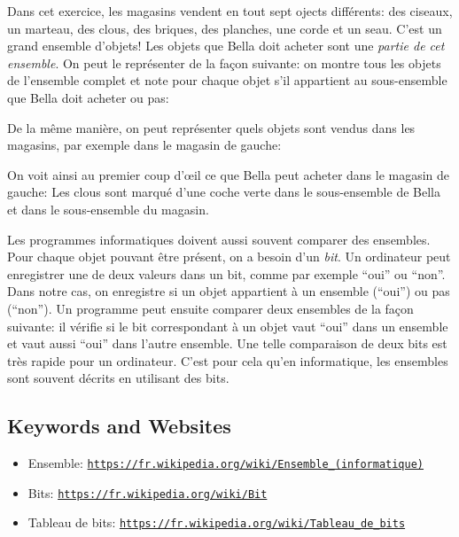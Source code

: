 \documentclass[a4paper,11pt]{report}
\newcommand{\BrochureUrlText}[1]{\texttt{#1}}
\newcommand{\taskGraphicsFolder}{..}
\begin{document}
Dans cet exercice, les magasins vendent en tout sept ojects différents: des ciseaux, un marteau, des clous, des briques, des planches, une corde et un seau. C’est un grand ensemble d’objets! Les objets que Bella doit acheter sont une \emph{partie de cet ensemble}. On peut le représenter de la façon suivante: on montre tous les objets de l’ensemble complet et note pour chaque objet s’il appartient au sous-ensemble que Bella doit acheter ou pas:

{\centering%
\par}

De la même manière, on peut représenter quels objets sont vendus dans les magasins, par exemple dans le magasin de gauche:

{\centering%
\par}

On voit ainsi au premier coup d’œil ce que Bella peut acheter dans le magasin de gauche: Les clous sont marqué d’une coche verte dans le sous-ensemble de Bella et dans le sous-ensemble du magasin.

Les programmes informatiques doivent aussi souvent comparer des ensembles. Pour chaque objet pouvant être présent, on a besoin d’un \emph{bit}. Un ordinateur peut enregistrer une de deux valeurs dans un bit, comme par exemple “oui” ou “non”. Dans notre cas, on enregistre si un objet appartient à un ensemble (“oui”) ou pas (“non”). Un programme peut ensuite comparer deux ensembles de la façon suivante: il vérifie si le bit correspondant à un objet vaut “oui” dans un ensemble et vaut aussi “oui” dans l’autre ensemble. Une telle comparaison de deux bits est très rapide pour un ordinateur. C’est pour cela qu’en informatique, les ensembles sont souvent décrits en utilisant des bits.

{\raggedright

\subsection*{Keywords and Websites}

\begin{itemize}
  \item Ensemble: \href{https://fr.wikipedia.org/wiki/Ensemble_(informatique)}{\BrochureUrlText{https://fr.wikipedia.org/wiki/Ensemble\_(informatique)}}
  \item Bits: \href{https://fr.wikipedia.org/wiki/Bit}{\BrochureUrlText{https://fr.wikipedia.org/wiki/Bit}}
  \item Tableau de bits: \href{https://fr.wikipedia.org/wiki/Tableau_de_bits}{\BrochureUrlText{https://fr.wikipedia.org/wiki/Tableau\_de\_bits}}
\end{itemize}


}
\end{document}
